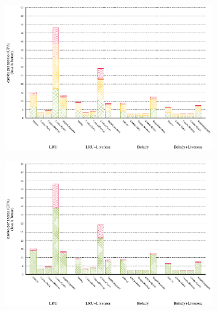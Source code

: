 \documentclass[onecolumn, openright, master, english, signatures]{dbrgrptt}
\begin{document}
\begin{figure}[!ht]
  \begin{subfigure}[b]{0.5\textwidth}%
    \includegraphics[width=\textwidth]{figs/plots/perf-445-gobmk.eps}
  \end{subfigure}%
    \begin{subfigure}[b]{0.5\textwidth}%
    \includegraphics[width=\textwidth]{figs/plots/perf-misses-445-gobmk.eps}
  \end{subfigure}%
  \caption{}
  \label{fig:todo}
\end{figure}
\end{document}
